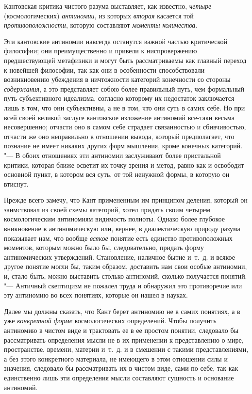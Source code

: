Кантовская критика чистого разума выставляет, как известно,
{\em четыре} (космологических)
{\em антиномии}, из которых
{\em вторая} касается той
{\em противоположности}, которую составляют
{\em моменты количества}.

Эти кантовские антиномии навсегда останутся важной частью критической
философии; они преимущественно и привели к ниспровержению предшествующей
метафизики и могут быть рассматриваемы как главный переход к новейшей
философии, так как они в особенности способствовали возникновению убеждения
в ничтожности категорий конечности со стороны
{\em содержания}, а это представляет собою более
правильный путь, чем формальный путь субъективного идеализма, согласно
которому их недостаток заключается лишь в том, что они субъективны, а не в
том, что они суть в самих себе. Но при всей своей великой заслуге
кантовское изложение антиномий все-таки весьма несовершенно; отчасти оно в
самом себе страдает связанностью и сбивчивостью, отчасти же оно неправильно
в отношении вывода, который предполагает, что познание не имеет никаких
других форм мышления, кроме конечных категорий. "--- В обоих отношениях эти
антиномии заслуживают более пристальной критики, которая ближе осветит их
точку зрения и метод, равно как и освободит основной пункт, в котором вся
суть, от той ненужной формы, в которую он втиснут.

Прежде всего замечу, что Кант примененным им принципом деления, который он
заимствовал из своей схемы категорий, хотел придать своим четырем
космологическим антиномиям видимость полноты. Однако более глубокое
вникновение в антиномическую или, вернее, в диалектическую природу разума
показывает нам, что вообще {\em всякое} понятие есть
единство противоположных моментов, которым можно было бы, следовательно,
придать форму антиномических утверждений. Становление, наличное бытие
и~т.~д. и всякое другое понятие могли бы, таким образом, доставить нам свои
особые антиномии, и, стало быть, можно выставить столько антиномий, сколько
получается понятий. "--- Античный скептицизм не пожалел труда и обнаружил это
противоречие или эту антиномию во всех понятиях, которые он нашел в науках.

Далее мы должны сказать, что Кант берет антиномию не в самих понятиях, а в
уже {\em конкретной форме} космологических определений.
Чтобы получить антиномию в чистом виде и трактовать ее в ее простом
понятии, следовало бы рассматривать определения мысли не в их применении к
представлению о мире, пространстве, времени, материи и~т.~д. и в смешении с
такими представлениями, а без этого конкретного материала, не имеющего в
этом отношении силы и значения, следовало бы рассматривать их в чистом
виде, сами по себе, так как единственно лишь эти определения мысли
составляют сущность и основание антиномий.

